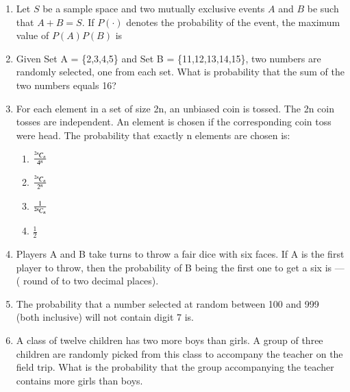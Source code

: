 \documentclass[journal,12pt,twocolumn]{IEEEtran}
\begin{document}
\begin{enumerate}
\\
\solution

%
\item Let $S$ be a sample space and two mutually exclusive events $A$ and $B$ be such that $A + B = S$. If $P(\cdot)$ denotes the probability of the event, the maximum value of $P(A)P(B)$ is
\\
\solution

%
% 
%
\item Given Set A = \{2,3,4,5\} and Set B = \{11,12,13,14,15\}, two numbers are randomly selected, one from each set. What is probability that the sum of the two numbers equals 16?
\\
%
\solution

%
\item For each element in a set of size 2n, an unbiased coin is tossed. The 2n coin tosses are independent. An element is chosen if the corresponding coin toss were head. The probability that exactly n elements are chosen is:\\
\begin{enumerate}
    \item $\frac{{{}^{2n}\mkern-1muC_{n}}}{4^{n}}$ \hspace{1cm}\\
    \item $\frac{{{}^{2n}\mkern-1muC_{n}}}{2^{n}}$ \hspace{1cm}\\
    \item $\frac{1}{{{}^{2n}\mkern-1muC_{n}}}$ \hspace{1cm}\\
    \item $\frac{1}{2}$
\end{enumerate}
%
\solution

%
\item Players A and B take turns to throw a fair dice with six faces. If A is the first player to throw, then the probability of B being the first one to get a six is --- ( round of to two decimal places). \\
\solution

%
\item The probability that a number selected at random between 100 and 999 (both inclusive) will not contain digit 7 is.
\solution

%
\item A class of twelve children has two more boys than girls. A group of three children are randomly picked from this class to accompany the teacher on the field trip. What is the probability that the group accompanying the teacher contains more girls than boys.\\

\end{enumerate}
\end{document}
